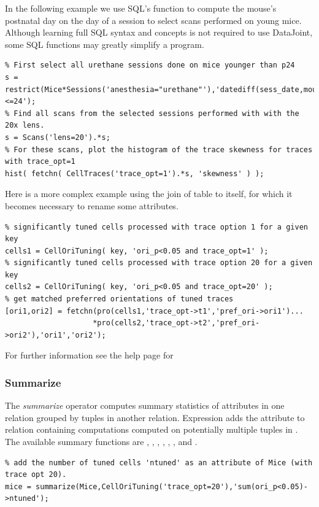 \documentclass[10pt]{article}
\begin{document}
In the following example we use SQL's  function to compute the mouse's postnatal day on the day of a session to select scans performed on young mice.  Although learning full SQL syntax and concepts is not required to use DataJoint, some SQL functions may greatly simplify a program.

\begin{lstlisting}
% First select all urethane sessions done on mice younger than p24
s = restrict(Mice*Sessions('anesthesia="urethane"'),'datediff(sess_date,mouse_dob)<=24');  
% Find all scans from the selected sessions performed with with the 20x lens.
s = Scans('lens=20').*s;
% For these scans, plot the histogram of the trace skewness for traces with trace_opt=1
hist( fetchn( CellTraces('trace_opt=1').*s, 'skewness' ) ); 
\end{lstlisting}   

Here is a more complex example using the join of table to itself, for which it becomes necessary to rename some attributes.
\begin{lstlisting}
% significantly tuned cells processed with trace option 1 for a given key
cells1 = CellOriTuning( key, 'ori_p<0.05 and trace_opt=1' ); 
% significantly tuned cells processed with trace option 20 for a given key
cells2 = CellOriTuning( key, 'ori_p<0.05 and trace_opt=20' ); 
% get matched preferred orientations of tuned traces 
[ori1,ori2] = fetchn(pro(cells1,'trace_opt->t1','pref_ori->ori1')...
                    *pro(cells2,'trace_opt->t2','pref_ori->ori2'),'ori1','ori2');
\end{lstlisting}

For further information see the help page for 

\subsubsection{Summarize}\label{sec:summarize}
The {\em summarize} operator computes summary statistics of attributes in one relation grouped by tuples in another relation.  Expression   adds the attribute  to relation  containing computations computed on potentially multiple tuples in .   The available summary functions are , , , , , , and .

\begin{lstlisting}
% add the number of tuned cells 'ntuned' as an attribute of Mice (with trace opt 20).
mice = summarize(Mice,CellOriTuning('trace_opt=20'),'sum(ori_p<0.05)->ntuned');
\end{lstlisting}
\end{document}
